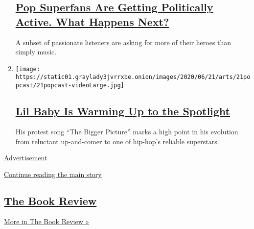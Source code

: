 \begin{enumerate}
  \hypertarget{pop-superfans-are-getting-politically-active-what-happens-next}{%
  \subsection{\texorpdfstring{\href{/2020/06/30/arts/music/popcast-superfans-politics.html}{Pop
  Superfans Are Getting Politically Active. What Happens
  Next?}}{Pop Superfans Are Getting Politically Active. What Happens Next?}}\label{pop-superfans-are-getting-politically-active-what-happens-next}}

  A subset of passionate listeners are asking for more of their heroes
  than simply music.
\item
  \texttt{[image: https://static01.graylady3jvrrxbe.onion/images/2020/06/21/arts/21popcast/21popcast-videoLarge.jpg]}

  \hypertarget{lil-baby-is-warming-up-to-the-spotlight}{%
  \subsection{\texorpdfstring{\href{/2020/06/21/arts/music/popcast-lil-baby.html}{Lil
  Baby Is Warming Up to the
  Spotlight}}{Lil Baby Is Warming Up to the Spotlight}}\label{lil-baby-is-warming-up-to-the-spotlight}}

  His protest song ``The Bigger Picture'' marks a high point in his
  evolution from reluctant up-and-comer to one of hip-hop's reliable
  superstars.
\end{enumerate}

Advertisement

\protect\hyperlink{after-mid3}{Continue reading the main story}

\hypertarget{the-book-review}{%
\subsection{\texorpdfstring{\href{/column/book-review-podcast}{The Book
Review}}{The Book Review}}\label{the-book-review}}

\href{/column/book-review-podcast}{More in The Book Review »}

